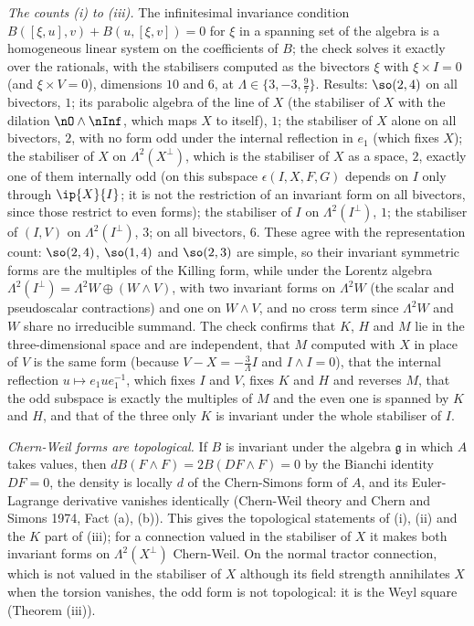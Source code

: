 \emph{The counts (i) to (iii).} The infinitesimal invariance condition $B([\xi, u], v) + B(u, [\xi, v]) = 0$ for $\xi$ in a spanning set of the algebra is a homogeneous linear system on the coefficients of $B$; the check solves it exactly over the rationals, with the stabilisers computed as the bivectors $\xi$ with $\xi \times I = 0$ (and $\xi \times V = 0$), dimensions $10$ and $6$, at $\Lambda \in \{3, -3, \tfrac97\}$. Results: $\so(2,4)$ on all bivectors, $1$; its parabolic algebra of the line of $X$ (the stabiliser of $X$ with the dilation $\nO \wedge \nInf$, which maps $X$ to itself), $1$; the stabiliser of $X$ alone on all bivectors, $2$, with no form odd under the internal reflection in $e_{1}$ (which fixes $X$); the stabiliser of $X$ on $\Lambda^{2}(X^{\perp})$, which is the stabiliser of $X$ as a space, $2$, exactly one of them internally odd (on this subspace $\epsilon(I, X, F, G)$ depends on $I$ only through $\ip{X}{I}$; it is not the restriction of an invariant form on all bivectors, since those restrict to even forms); the stabiliser of $I$ on $\Lambda^{2}(I^{\perp})$, $1$; the stabiliser of $(I, V)$ on $\Lambda^{2}(I^{\perp})$, $3$; on all bivectors, $6$. These agree with the representation count: $\so(2,4)$, $\so(1,4)$ and $\so(2,3)$ are simple, so their invariant symmetric forms are the multiples of the Killing form, while under the Lorentz algebra $\Lambda^{2}(I^{\perp}) = \Lambda^{2}W \oplus (W \wedge V)$, with two invariant forms on $\Lambda^{2}W$ (the scalar and pseudoscalar contractions) and one on $W \wedge V$, and no cross term since $\Lambda^{2}W$ and $W$ share no irreducible summand. The check confirms that $K$, $H$ and $M$ lie in the three-dimensional space and are independent, that $M$ computed with $X$ in place of $V$ is the same form (because $V - X = -\tfrac{3}{\Lambda}I$ and $I \wedge I = 0$), that the internal reflection $u \mapsto e_{1}ue_{1}^{-1}$, which fixes $I$ and $V$, fixes $K$ and $H$ and reverses $M$, that the odd subspace is exactly the multiples of $M$ and the even one is spanned by $K$ and $H$, and that of the three only $K$ is invariant under the whole stabiliser of $I$.

\emph{Chern-Weil forms are topological.} If $B$ is invariant under the algebra $\mathfrak{g}$ in which $A$ takes values, then $dB(F \wedge F) = 2B(DF \wedge F) = 0$ by the Bianchi identity $DF = 0$, the density is locally $d$ of the Chern-Simons form of $A$, and its Euler-Lagrange derivative vanishes identically (Chern-Weil theory and Chern and Simons 1974, Fact (a), (b)). This gives the topological statements of (i), (ii) and the $K$ part of (iii); for a connection valued in the stabiliser of $X$ it makes both invariant forms on $\Lambda^{2}(X^{\perp})$ Chern-Weil. On the normal tractor connection, which is not valued in the stabiliser of $X$ although its field strength annihilates $X$ when the torsion vanishes, the odd form is not topological: it is the Weyl square (Theorem (iii)).

